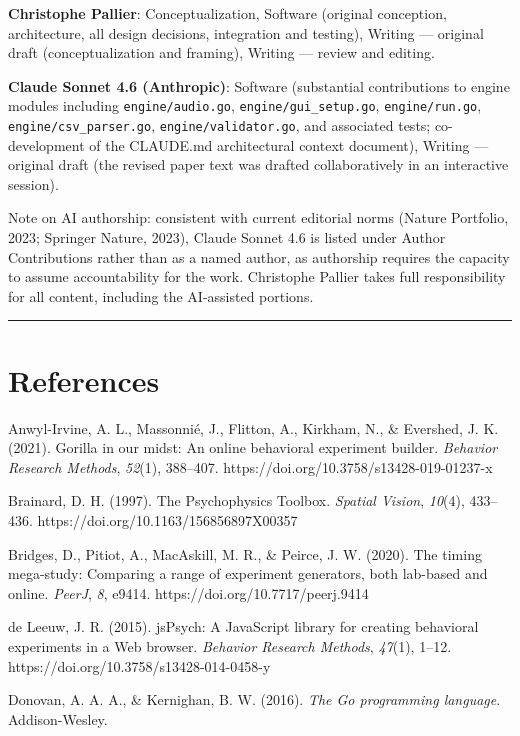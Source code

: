 \documentclass[
  11pt,
]{article}
\begin{document}
\textbf{Christophe Pallier}: Conceptualization, Software (original
conception, architecture, all design decisions, integration and
testing), Writing --- original draft (conceptualization and framing),
Writing --- review and editing.

\textbf{Claude Sonnet 4.6 (Anthropic)}: Software (substantial
contributions to engine modules including \texttt{engine/audio.go},
\texttt{engine/gui\_setup.go}, \texttt{engine/run.go},
\texttt{engine/csv\_parser.go}, \texttt{engine/validator.go}, and
associated tests; co-development of the CLAUDE.md architectural context
document), Writing --- original draft (the revised paper text was
drafted collaboratively in an interactive session).

Note on AI authorship: consistent with current editorial norms (Nature
Portfolio, 2023; Springer Nature, 2023), Claude Sonnet 4.6 is listed
under Author Contributions rather than as a named author, as authorship
requires the capacity to assume accountability for the work. Christophe
Pallier takes full responsibility for all content, including the
AI-assisted portions.

\begin{center}\rule{0.5\linewidth}{0.5pt}\end{center}

\section{References}\label{references}

Anwyl-Irvine, A. L., Massonnié, J., Flitton, A., Kirkham, N., \&
Evershed, J. K. (2021). Gorilla in our midst: An online behavioral
experiment builder. \emph{Behavior Research Methods}, \emph{52}(1),
388--407. https://doi.org/10.3758/s13428-019-01237-x

Brainard, D. H. (1997). The Psychophysics Toolbox. \emph{Spatial
Vision}, \emph{10}(4), 433--436. https://doi.org/10.1163/156856897X00357

Bridges, D., Pitiot, A., MacAskill, M. R., \& Peirce, J. W. (2020). The
timing mega-study: Comparing a range of experiment generators, both
lab-based and online. \emph{PeerJ}, \emph{8}, e9414.
https://doi.org/10.7717/peerj.9414

de Leeuw, J. R. (2015). jsPsych: A JavaScript library for creating
behavioral experiments in a Web browser. \emph{Behavior Research
Methods}, \emph{47}(1), 1--12. https://doi.org/10.3758/s13428-014-0458-y

Donovan, A. A. A., \& Kernighan, B. W. (2016). \emph{The Go programming
language}. Addison-Wesley.
\end{document}

